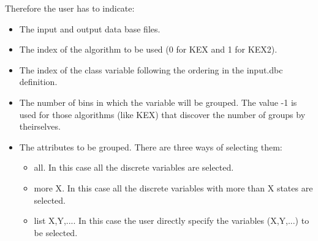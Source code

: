 Therefore the user has to indicate:
\begin{itemize}
\item The input and output data base files.
\item The index of the algorithm to be used (0 for KEX and 1 for KEX2).
\item The index of the class variable following the ordering in the input.dbc definition.
\item The number of bins in which the variable will be grouped. The value 
-1 is used for those algorithms (like KEX) that discover the number of groups by theirselves.
\item The attributes to be grouped. There are three ways of selecting them:
\begin{itemize}
\item {\sf all}. In this case all the discrete variables are selected.
\item {\sf more X}. In this case all the discrete variables with more than X states are selected.
\item {\sf list X,Y,...}. In this case the user directly specify the variables (X,Y,...) to be selected.
\end{itemize}
\end{itemize}

